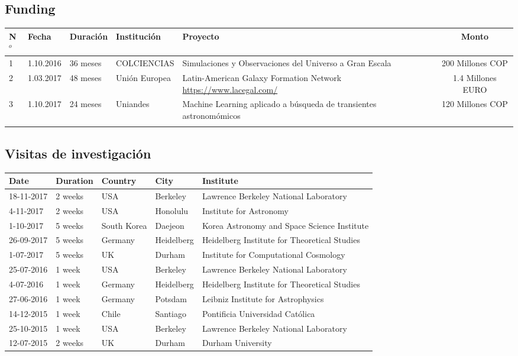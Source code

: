\documentclass{article}
\begin{document}
\subsection{Funding}
\begin{tabular}{l l l p{2.4cm} p{4.0cm} c}\hline
N$^{o}$ & Fecha & Duraci\'on & Instituci\'on & Proyecto & Monto \\\hline
1 & 1.10.2016 & 36 meses & COLCIENCIAS & Simulaciones y Observaciones del Universo a Gran Escala & 200 Millones COP\\\hline
2 & 1.03.2017 & 48 meses & Uni\'on Europea & Latin-American Galaxy Formation Network \url{https://www.lacegal.com/} & 1.4 Millones EURO \\\hline
3 & 1.10.2017 & 24 meses & Uniandes & Machine Learning aplicado a b\'usqueda de transientes astronom\'omicos& 120 Millones COP \\
\\\hline 
\end{tabular}

\subsection{Visitas de investigaci\'on}
\begin{tabular}{p{1.7cm} p{1.3cm} p{2.0cm} p{1.5cm} p{7.0cm}}\hline
Date & Duration & Country & City & Institute\\\hline
18-11-2017 & 2 weeks & USA & Berkeley & Lawrence Berkeley National Laboratory\\
4-11-2017 & 2 weeks & USA & Honolulu & Institute for Astronomy\\
1-10-2017 & 5 weeks & South Korea & Daejeon & Korea Astronomy and Space Science Institute \\
26-09-2017 & 5 weeks & Germany & Heidelberg & Heidelberg Institute for Theoretical Studies\\
1-07-2017 & 5 weeks & UK & Durham & Institute for Computational Cosmology\\
25-07-2016 & 1 week & USA & Berkeley & Lawrence Berkeley National Laboratory\\
4-07-2016 & 1 week & Germany & Heidelberg & Heidelberg Institute for Theoretical Studies \\
27-06-2016 & 1 week & Germany & Potsdam & Leibniz Institute for Astrophysics \\
14-12-2015 & 1 week & Chile & Santiago & Pontificia Universidad Cat\'olica\\
25-10-2015 & 1 week & USA & Berkeley & Lawrence Berkeley National Laboratory\\
12-07-2015 & 2 weeks & UK & Durham & Durham University\\\hline
\end{tabular}
\end{document}
